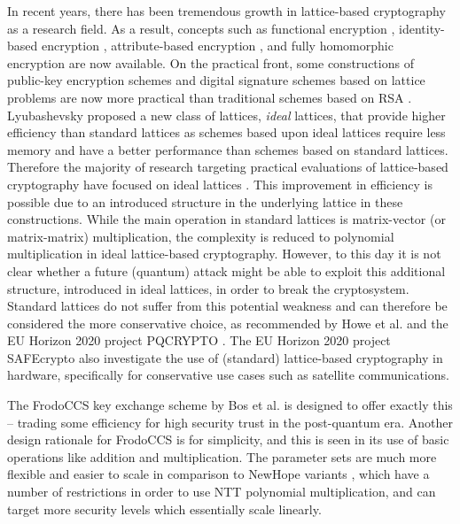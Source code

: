 In recent years, there has been tremendous growth in lattice-based cryptography as a research field. As a result, concepts such as functional encryption \cite{DBLP:conf/tcc/BonehSW11}, identity-based encryption \cite{DBLP:conf/asiacrypt/DucasLP14}, attribute-based encryption \cite{DBLP:conf/tcc/Boyen13}, and fully homomorphic encryption \cite{gentry2009fully} are now available. On the practical front, some constructions of public-key encryption schemes and digital signature schemes based on lattice problems are now more practical than traditional schemes based on RSA \cite{DBLP:journals/tecs/HowePOOG15}. Lyubashevsky \cite{DBLP:conf/pkc/Lyubashevsky08,DBLP:conf/eurocrypt/LyubashevskyPR10} proposed a new class of lattices, \textit{ideal} lattices, that provide higher efficiency than standard lattices as schemes based upon ideal lattices require less memory and have a better performance than schemes based on standard lattices. Therefore the majority of research targeting practical evaluations of lattice-based cryptography have focused on ideal lattices \cite{DBLP:conf/ches/GottertFSBH12, DBLP:conf/pqcrypto/GuneysuOPS13, ducas2013lattice, DBLP:conf/ches/RoyVMCV14,DBLP:journals/iacr/0001SRGKV15, DBLP:conf/cans/LongaN16,rtesla}. This improvement in efficiency is possible due to an introduced structure in the underlying lattice in these constructions. While the main operation in standard lattices is matrix-vector (or matrix-matrix) multiplication, the complexity is reduced to polynomial multiplication in ideal lattice-based cryptography. However, to this day it is not clear whether a future (quantum) attack might be able to exploit this additional structure, introduced in ideal lattices, in order to break the cryptosystem. Standard lattices do not suffer from this potential weakness and can therefore be considered the more conservative choice, as recommended by Howe et al. \cite{DBLP:conf/dac/HoweMORGB16} and the EU Horizon 2020 project PQCRYPTO \cite{initial}. The EU Horizon 2020 project SAFEcrypto also investigate the use of (standard) lattice-based cryptography in hardware, specifically for conservative use cases such as satellite communications.

The \textsf{FrodoCCS} key exchange scheme by Bos et al. \cite{DBLP:conf/ccs/BosCDMNNRS16} is designed to offer exactly this -- trading some efficiency for high security trust in the post-quantum era. Another design rationale for \textsf{FrodoCCS} is for simplicity, and this is seen in its use of basic operations like addition and multiplication. The parameter sets are much more flexible and easier to scale in comparison to \textsf{NewHope} variants \cite{DBLP:conf/uss/AlkimDPS16,NISTPQC-R1:NewHope17}, which have a number of restrictions in order to use NTT polynomial multiplication, and can target more security levels which essentially scale linearly.

